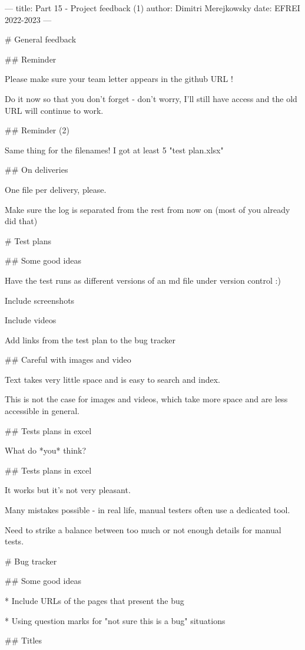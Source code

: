 ---
title: Part 15 - Project feedback (1)
author: Dimitri Merejkowsky
date: EFREI 2022-2023
---

# General feedback

## Reminder

Please make sure your team letter appears in the github URL !

Do it now so that you don't forget - don't worry, I'll still have access
and the old URL will continue to work.

## Reminder (2)

Same thing for the filenames! I got at least 5 "test plan.xlsx"

## On deliveries

One file per delivery, please.

Make sure the log is separated from the rest from now on
(most of you already did that)

# Test plans


## Some good ideas

Have the test runs as different versions of an md file under
version control :)

Include screenshots

Include videos

Add links from the test plan to the bug tracker

## Careful with images and video

Text takes very little space and is easy to search and index.

\vfill

This is not the case for images and videos, which take more space
and are less accessible in general.

## Tests plans in excel

What do *you* think?

## Tests plans in excel

It works but it's not very pleasant.

Many mistakes possible - in real life, manual testers often use a
dedicated tool.

Need to strike a balance between too much or not enough details for
manual tests.

# Bug tracker

## Some good ideas

* Include URLs of the pages that present the bug

* Using question marks for "not sure this is a bug" situations

## Titles

